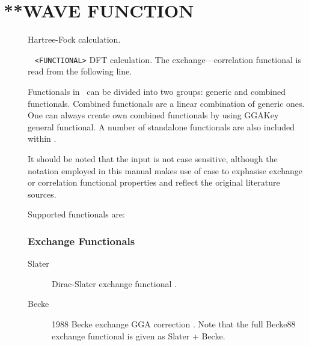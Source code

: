 \section{**WAVE FUNCTION}\label{sec:wavefunc}
\begin{description}
\item[] Hartree-Fock calculation.
\item[] \verb| | \newline
\verb|<FUNCTIONAL>|\newline
DFT calculation. The exchange---correlation functional is read from the following line.

Functionals in \lsdalton\ can be divided into two groups: generic and combined functionals. 
Combined functionals are a linear combination of generic ones. 
One can always create own combined functionals by using GGAKey general functional.
A number of standalone functionals are also included within \lsdalton. 

It should be noted that the input is not case sensitive, although the notation
employed in this manual makes use of case to exphasise exchange or correlation 
functional properties and reflect the original literature sources.

Supported functionals are: 
\subsubsection{Exchange Functionals}
\providecommand\exfn[1]{#1}

\begin{description}
\item[Slater] Dirac-Slater exchange functional \cite{dft:hohenberg,dft:kohn,dft:slater}.

\item[Becke] 1988 Becke exchange GGA correction \cite{dft:becke88}. Note that the full Becke88 exchange functional is given as \exfn{Slater} + \exfn{Becke}.




\end{description}
\end{description}
